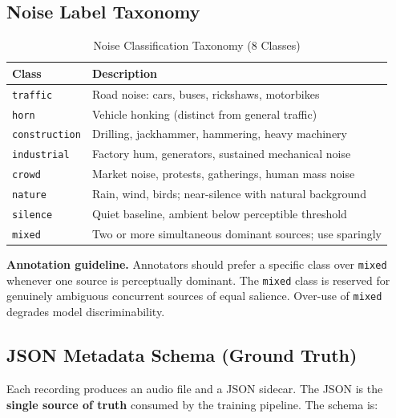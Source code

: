 \documentclass[11pt,a4paper]{article}
\begin{document}
\subsection{Noise Label Taxonomy}

\begin{table}[h]
\centering
\caption{Noise Classification Taxonomy (8 Classes)}
\begin{tabular}{@{}p{3cm}p{10cm}@{}}
\toprule
\textbf{Class} & \textbf{Description} \\
\midrule
\texttt{traffic}      & Road noise: cars, buses, rickshaws, motorbikes \\
\texttt{horn}         & Vehicle honking (distinct from general traffic) \\
\texttt{construction} & Drilling, jackhammer, hammering, heavy machinery \\
\texttt{industrial}   & Factory hum, generators, sustained mechanical noise \\
\texttt{crowd}        & Market noise, protests, gatherings, human mass noise \\
\texttt{nature}       & Rain, wind, birds; near-silence with natural background \\
\texttt{silence}      & Quiet baseline, ambient below perceptible threshold \\
\texttt{mixed}        & Two or more simultaneous dominant sources; use sparingly \\
\bottomrule
\end{tabular}
\end{table}

\textbf{Annotation guideline.} Annotators should prefer a specific class over
\texttt{mixed} whenever one source is perceptually dominant. The \texttt{mixed}
class is reserved for genuinely ambiguous concurrent sources of equal salience.
Over-use of \texttt{mixed} degrades model discriminability.

\subsection{JSON Metadata Schema (Ground Truth)}

Each recording produces an audio file and a JSON sidecar. The JSON is the
\textbf{single source of truth} consumed by the training pipeline. The schema is:
\end{document}

